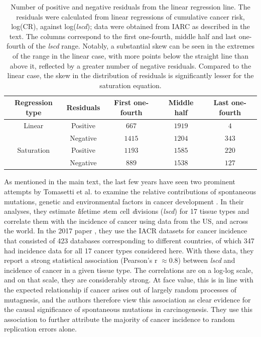 \documentclass[9pt,twocolumn,twoside]{pnas-new}
\begin{document}
		\begin{table}[tbhp]
			\centering
			\caption{Number of positive and negative residuals from the linear regression line. The residuals were calculated from linear regressions of cumulative cancer risk, log(CR), against log(\textit{lscd}); data were obtained from IARC as described in the text. The columns correspond to the first one-fourth, middle half and last one-fourth of the \textit{lscd} range. Notably, a substantial skew can be seen in the extremes of the range in the linear case, with more points below the straight line than above it, reflected by a greater number of negative residuals. Compared to the linear case, the skew in the distribution of residuals is significantly lesser for the saturation equation.}
			\begin{tabular}[c]{ccccc}
				\textbf{Regression type} & \textbf{Residuals} & \textbf{First one-fourth} & \textbf{Middle half} & \textbf{Last one-fourth} \\
				\hline
				Linear & Positive & $667$ & $1919$ & $4$ \\
			  	& Negative & $1415$ & $1204$ & $343$ \\
				Saturation & Positive & $1193$ & $1585$ & $220$ \\
			 	& Negative & $889$ & $1538$ & $127$ \\
			 	\hline
			\end{tabular}
			\label{Table S3.2}
		\end{table}

		As mentioned in the main text, the last few years have seen two prominent attempts by Tomasetti et al. to examine the relative contributions of spontaneous mutations, genetic and environmental factors in cancer development \cite{Tomasetti78, Tomasetti2017}.  In their analyses, they estimate \textit{l}ifetime \textit{s}tem \textit{c}ell \textit{d}ivisions (\textit{lscd}) for 17 tissue types and correlate them with the incidence of cancer using data from the US, and across the world. In the 2017 paper \cite{Tomasetti2017}, they use the IACR datasets for cancer incidence that consisted of 423 databases corresponding to different countries, of which 347 had incidence data for all 17 cancer types considered here. With these data, they report a strong statistical association (Pearson’s r $\approx 0.8$) between \textit{lscd} and incidence of cancer in a given tissue type. The correlations are on a log-log scale, and on that scale, they are considerably strong. At face value, this is in line with the expected relationship if cancer arises out of largely random processes of mutagnesis, and the authors therefore view this association as clear evidence for the causal significance of spontaneous mutations in carcinogenesis. They use this association to further attribute the majority of cancer incidence to random replication errors alone.
\end{document}
